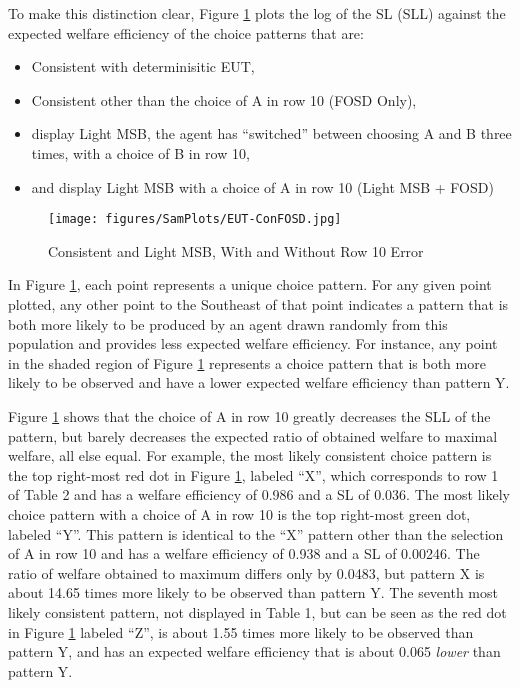 \documentclass[../main.tex]{subfiles}
\begin{document}
To make this distinction clear, Figure \ref{fig:ConFOSD} plots the log of the SL (SLL) against the expected welfare efficiency of the choice patterns that are:
\begin{itemize}
 \setlength\itemsep{-.5em}
	\item Consistent with determinisitic EUT,
	\item Consistent other than the choice of A in row 10 (FOSD Only),
	\item display Light MSB, the agent has \enquote{switched} between choosing A and B three times, with a choice of B in row 10,
	\item and display Light MSB with a choice of A in row 10 (Light MSB + FOSD)
\end{itemize}

\begin{figure}[h!]
	\caption{Consistent and Light MSB, With and Without Row 10 Error}
	\texttt{[image: figures/SamPlots/EUT-ConFOSD.jpg]}
	\label{fig:ConFOSD}
\end{figure}

In Figure \ref{fig:ConFOSD}, each point represents a unique choice pattern.
For any given point plotted, any other point to the Southeast of that point indicates a pattern that is both more likely to be produced by an agent drawn randomly from this population and provides less expected welfare efficiency.
For instance, any point in the shaded region of Figure \ref{fig:ConFOSD} represents a choice pattern that is both more likely to be observed and have a lower expected welfare efficiency than pattern Y.

Figure \ref{fig:ConFOSD} shows that the choice of A in row 10 greatly decreases the SLL of the pattern, but barely decreases the expected ratio of obtained welfare to maximal welfare, all else equal.
For example, the most likely consistent choice pattern is the top right-most red dot in Figure \ref{fig:ConFOSD}, labeled \enquote{X}, which corresponds to row 1 of Table 2 and has a welfare efficiency of 0.986 and a SL of 0.036.
The most likely choice pattern with a choice of A in row 10 is the top right-most green dot, labeled \enquote{Y}.
This pattern is identical to the \enquote{X} pattern other than the selection of A in row 10 and has a welfare efficiency of 0.938 and a SL of 0.00246.
The ratio of welfare obtained to maximum differs only by 0.0483, but pattern X is about 14.65 times more likely to be observed than pattern Y.
The seventh most likely consistent pattern, not displayed in Table 1, but can be seen as the red dot in Figure \ref{fig:ConFOSD} labeled \enquote{Z}, is about 1.55 times more likely to be observed than pattern Y, and has an expected welfare efficiency that is about 0.065 \textit{lower} than pattern Y.
\end{document}
